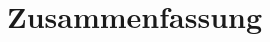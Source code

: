 \documentclass[crop=false]{standalone}
\begin{document}
\section*{Zusammenfassung}

\lipsum[4-6] %
\end{document}
